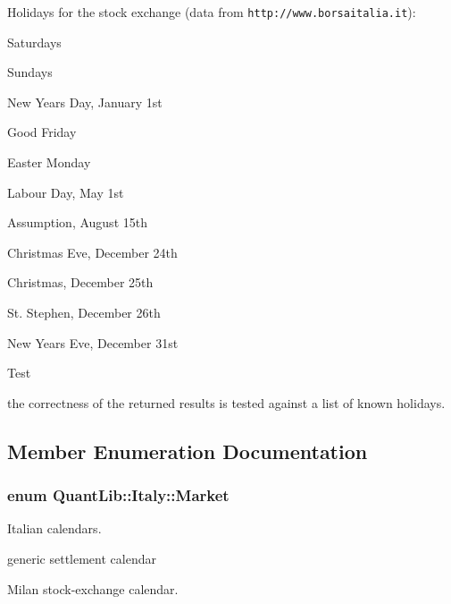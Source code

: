 Holidays for the stock exchange (data from {\tt http\+://www.\+borsaitalia.\+it})\+: 
\begin{DoxyItemize}
\item Saturdays 
\item Sundays 
\item New Year\textquotesingle{}s Day, January 1st 
\item Good Friday 
\item Easter Monday 
\item Labour Day, May 1st 
\item Assumption, August 15th 
\item Christmas\textquotesingle{} Eve, December 24th 
\item Christmas, December 25th 
\item St. Stephen, December 26th 
\item New Year\textquotesingle{}s Eve, December 31st 
\end{DoxyItemize}

\begin{DoxyRefDesc}{Test}
\item[{\bf Test}]the correctness of the returned results is tested against a list of known holidays. \end{DoxyRefDesc}


\subsection{Member Enumeration Documentation}
\subsubsection[{Market}]{\setlength{\rightskip}{0pt plus 5cm}enum {\bf Quant\+Lib\+::\+Italy\+::\+Market}}\label{class_quant_lib_1_1_italy_a2b8a3cf634716660cfe3e451c8596d6d}


Italian calendars. 

\begin{Desc}
\item[Enumerator]\par
\begin{description}
\item[{\em 
Settlement\label{class_quant_lib_1_1_italy_a2b8a3cf634716660cfe3e451c8596d6da32fde54c23880ecf760c21032503f2c9}
}]generic settlement calendar \item[{\em 
Exchange\label{class_quant_lib_1_1_italy_a2b8a3cf634716660cfe3e451c8596d6da7d1ca9c05255940db9158b403f95381a}
}]Milan stock-\/exchange calendar. \end{description}
\end{Desc}



